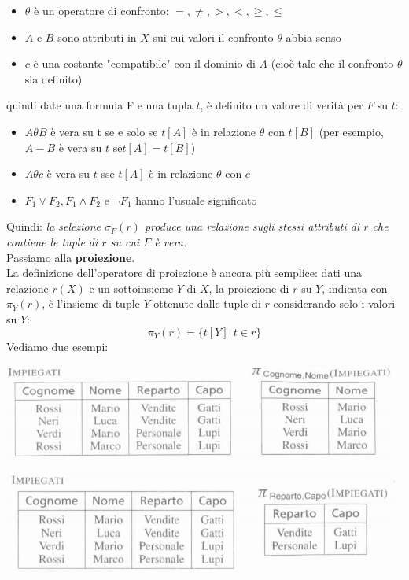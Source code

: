 \documentclass[a4paper,12pt, oneside]{book}
\begin{document}
\begin{itemize}
\item $\theta$ è un operatore di confronto: $=, \neq, >, <, \geq, \leq$
\item $A$ e $B$ sono attributi in $X$ sui cui valori il confronto $\theta$ abbia senso
\item $c$ è una costante "compatibile" con il dominio di $A$ (cioè tale che il confronto $\theta$ sia definito)
\end{itemize}
quindi date una formula F e una tupla $t$, è definito un valore di verità per $F$ su $t$:
\begin{itemize}
\item $A\theta B$ è vera su t se e solo se $t[A]$ è in relazione $\theta$ con $t[B]$ (per esempio, $A-B$ è vera su $t$ se$ t[A] = t[B]$)
\item $A\theta c$ è vera su $t$ sse $t[A]$ è in relazione $\theta$ con $c$
\item $F_1\vee F_2, F_1\wedge F_2$ e $\neg F_1$ hanno l'usuale significato
\end{itemize}
Quindi: \textit{la selezione $\sigma_F(r)$ produce una relazione sugli stessi attributi di $r$ che contiene le tuple di $r$ su cui $F$ è vera.}\\
Passiamo alla \textbf{proiezione}.\\
La definizione dell'operatore di proiezione è ancora più semplice: dati una
relazione $r(X)$ e un sottoinsieme $Y$ di $X$, la proiezione di $r$ su $Y$,
indicata con $\pi_Y(r)$, è l'insieme di tuple $Y$ ottenute dalle tuple di $r$
considerando solo i valori su $Y$:
\[\pi_Y(r)=\{t[Y]|\, t\in r\}\]
Vediamo due esempi:
\begin{center}
\includegraphics[scale=0.7]{img/alg8.png}
\end{center}
\begin{center}
\includegraphics[scale=0.7]{img/alg9.png}
\end{center}
\end{document}
